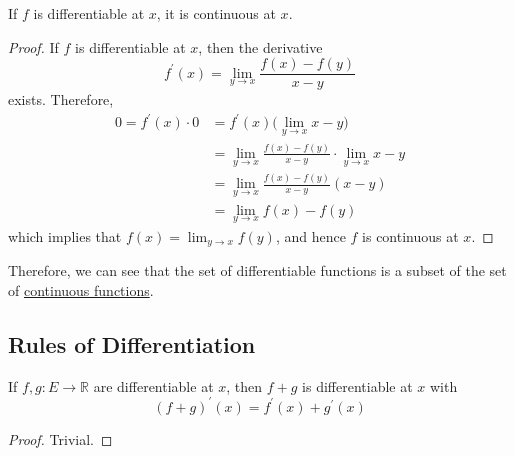   \begin{lemma}
    \label{thm:differentiability-implies-continuity}
    If $f$ is differentiable at $x$, it is continuous at $x$. 
  \end{lemma}
  \begin{proof} 
    If $f$ is differentiable at $x$, then the derivative 
    \begin{equation}
      f^\prime (x) = \lim_{y \to x} \frac{f(x) - f(y)}{x - y} 
    \end{equation}
    exists. Therefore, 
    \begin{align}
      0 = f^\prime (x) \cdot 0 & = f^\prime (x) \big( \lim_{y \to x} x - y \big) \\
                               & = \lim_{y \to x} \frac{f(x) - f(y)}{x - y} \cdot \lim_{y \to x} x - y \\
                               & = \lim_{y \to x} \frac{f(x) - f(y)}{x - y} (x - y) \\
                               & = \lim_{y \to x} f(x) - f(y)
    \end{align}
    which implies that $f(x) = \lim_{y \to x} f(y)$, and hence $f$ is continuous at $x$. 
  \end{proof} 

  Therefore, we can see that the set of differentiable functions is a subset of the set of \hyperref[pst-def:continuous_func]{continuous functions}.  

\subsection{Rules of Differentiation}

	\begin{lemma}
		\label{thm:linearity_differentiation}
		If $f, g: E \to \mathbb{R}$ are differentiable at $x$, then $f + g$ is differentiable at $x$ with 
		\begin{equation}
			(f + g)^\prime (x) = f^\prime (x) + g^\prime (x)
		\end{equation}
	\end{lemma}
	\begin{proof}
	  Trivial. 
	\end{proof}


